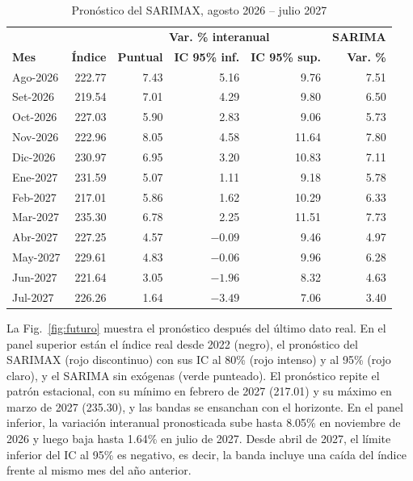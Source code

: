\documentclass[conference]{IEEEtran}
\begin{document}
\begin{table}[!htbp]
\centering
\caption{Pronóstico del SARIMAX, agosto 2026 -- julio 2027}
\label{tab:futuro}
\scriptsize
\setlength{\tabcolsep}{3pt}
\begin{tabularx}{\columnwidth}{@{}Xrrrrr@{}}
\toprule
 & & \multicolumn{3}{c}{\textbf{Var. \% interanual}} & \textbf{SARIMA} \\
\textbf{Mes} & \textbf{Índice} & \textbf{Puntual} & \textbf{IC 95\% inf.} & \textbf{IC 95\% sup.} & \textbf{Var. \%} \\
\midrule
Ago-2026 & 222.77 & 7.43 & 5.16 & 9.76 & 7.51 \\
Set-2026 & 219.54 & 7.01 & 4.29 & 9.80 & 6.50 \\
Oct-2026 & 227.03 & 5.90 & 2.83 & 9.06 & 5.73 \\
Nov-2026 & 222.96 & 8.05 & 4.58 & 11.64 & 7.80 \\
Dic-2026 & 230.97 & 6.95 & 3.20 & 10.83 & 7.11 \\
Ene-2027 & 231.59 & 5.07 & 1.11 & 9.18 & 5.78 \\
Feb-2027 & 217.01 & 5.86 & 1.62 & 10.29 & 6.33 \\
Mar-2027 & 235.30 & 6.78 & 2.25 & 11.51 & 7.73 \\
Abr-2027 & 227.25 & 4.57 & $-0.09$ & 9.46 & 4.97 \\
May-2027 & 229.61 & 4.83 & $-0.06$ & 9.96 & 6.28 \\
Jun-2027 & 221.64 & 3.05 & $-1.96$ & 8.32 & 4.63 \\
Jul-2027 & 226.26 & 1.64 & $-3.49$ & 7.06 & 3.40 \\
\bottomrule
\end{tabularx}
\end{table}

La Fig.~\ref{fig:futuro} muestra el pronóstico después del último dato real. En el panel superior están el índice real desde 2022 (negro), el pronóstico del SARIMAX (rojo discontinuo) con sus IC al 80\% (rojo intenso) y al 95\% (rojo claro), y el SARIMA sin exógenas (verde punteado). El pronóstico repite el patrón estacional, con su mínimo en febrero de 2027 (217.01) y su máximo en marzo de 2027 (235.30), y las bandas se ensanchan con el horizonte. En el panel inferior, la variación interanual pronosticada sube hasta 8.05\% en noviembre de 2026 y luego baja hasta 1.64\% en julio de 2027. Desde abril de 2027, el límite inferior del IC al 95\% es negativo, es decir, la banda incluye una caída del índice frente al mismo mes del año anterior.
\end{document}
